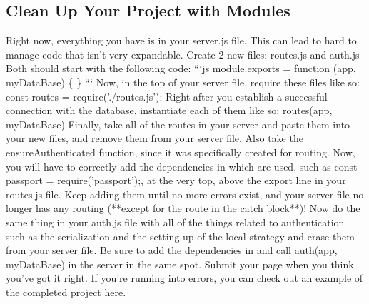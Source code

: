 \documentclass{article}%
\begin{document}
\subsection{Clean Up Your Project with Modules}%
\label{subsec:CleanUpYourProjectwithModules}%
Right now, everything you have is in your server.js file. This can lead to hard to manage code that isn't very expandable.\newline%
Create 2 new files: routes.js and auth.js\newline%
Both should start with the following code:\newline%
```js\newline%
module.exports = function (app, myDataBase) \{\newline%
\}\newline%
```\newline%
Now, in the top of your server file, require these files like so: const routes = require('./routes.js');\newline%
Right after you establish a successful connection with the database, instantiate each of them like so: routes(app, myDataBase)\newline%
Finally, take all of the routes in your server and paste them into your new files, and remove them from your server file. Also take the ensureAuthenticated function, since it was specifically created for routing. Now, you will have to correctly add the dependencies in which are used, such as const passport = require('passport');, at the very top, above the export line in your routes.js file.\newline%
Keep adding them until no more errors exist, and your server file no longer has any routing (**except for the route in the catch block**)!\newline%
Now do the same thing in your auth.js file with all of the things related to authentication such as the serialization and the setting up of the local strategy and erase them from your server file. Be sure to add the dependencies in and call auth(app, myDataBase) in the server in the same spot.\newline%
Submit your page when you think you've got it right. If you're running into errors, you can check out an example of the completed project here.\newline%

%
\end{document}

